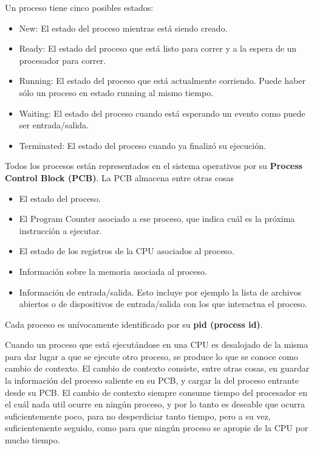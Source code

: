 \documentclass{article}
\begin{document}
Un proceso tiene cinco posibles estados:
\begin{itemize}
\item New: El estado del proceso mientras est\'a siendo creado.
\item Ready: El estado del proceso que est\'a listo para correr y a la espera de un procesador para correr.
\item Running: El estado del proceso que est\'a actualmente corriendo. Puede haber s\'olo un proceso en estado running al mismo tiempo.
\item Waiting: El estado del proceso cuando est\'a esperando un evento como puede ser entrada/salida.
\item Terminated: El estado del proceso cuando ya finaliz\'o su ejecuci\'on.
\end{itemize}

Todos los procesos est\'an representados en el sistema operativos por su \textbf{Process Control Block (PCB)}. La PCB almacena entre otras cosas
\begin{itemize}
\item El estado del proceso.
\item El Program Counter asociado a ese proceso, que indica cu\'al es la pr\'oxima instrucci\'on a ejecutar.
\item El estado de los registros de la CPU asociados al proceso.
\item Informaci\'on sobre la memoria asociada al proceso.
\item Informaci\'on de entrada/salida. Esto incluye por ejemplo la lista de archivos abiertos o de dispositivos de entrada/salida con los que interactua el proceso.
\end{itemize}

Cada proceso es un\'ivocamente identificado por su \textbf{pid (process id)}.

Cuando un proceso que est\'a ejecut\'andose en una CPU es desalojado de la misma para dar lugar a que se ejecute otro proceso, se produce lo que se conoce como cambio de contexto. El cambio de contexto consiste, entre otras cosas, en guardar la informaci\'on del proceso saliente en su PCB, y cargar la del proceso entrante desde su PCB. El cambio de contexto siempre consume tiempo del procesador en el cu\'al nada util ocurre en ning\'un proceso, y por lo tanto es deseable que ocurra suficientemente poco, para no desperdiciar tanto tiempo, pero a su vez, suficientemente seguido, como para que ning\'un proceso se apropie de la CPU por mucho tiempo.
\end{document}
